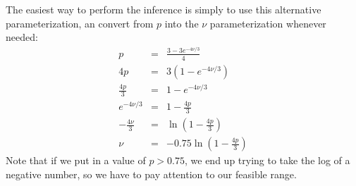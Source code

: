 \documentclass[11pt]{article}
\newcommand{\myA}{e^{-4\nu/3}}
\begin{document}
The easiest way to perform the inference is simply to use this alternative parameterization,
an convert from $p$ into the $\nu$ parameterization whenever needed:
\begin{eqnarray}
p & = & \frac{3 - 3 \myA}{4} \\
4 p &= & 3(1 - \myA) \\
\frac{4p}{3} & = & 1 -\myA \\
\myA &  = & 1 - \frac{4p}{3} \\
-\frac{4\nu}{3} &= & \ln\left(1 - \frac{4p}{3}\right) \\
\nu & = &  -0.75 \ln\left(1 - \frac{4p}{3}\right)
\end{eqnarray}
Note that if we put in a value of $p > 0.75$, we end up trying to take the log of a negative number, so we have to pay attention to our feasible range.
\end{document}
